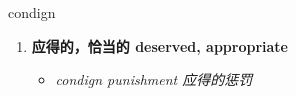 
\begin{frame}
{\huge condign}
\begin{center}
\begin{enumerate}\Large
  \item \textbf{应得的，恰当的 deserved, appropriate}
  \begin{itemize}
    \item \em{\Large{condign punishment 应得的惩罚}}
  \end{itemize}
\end{enumerate}
\end{center}
\end{frame}
